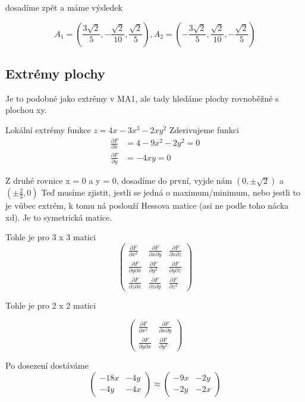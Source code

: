 \documentclass[12pt, letterpaper]{article}
\begin{document}
dosadíme zpět a máme výsledek

\[A_1 = \left(\frac{3\sqrt{2}}{5},  -\frac{\sqrt{2}}{10}, \frac{\sqrt{2}}{5}\right), A_2 = \left(-\frac{3\sqrt{2}}{5},  \frac{\sqrt{2}}{10}, -\frac{\sqrt{2}}{5}\right) \]

\subsection*{Extrémy plochy}
Je to podobné jako extrémy v MA1, ale tady hledáme plochy rovnoběžné s plochou xy.

Lokální extrémy funkce $z = 4x - 3x^3 - 2xy^2$
Zderivujeme funkci
\[\begin{aligned}
\frac{\partial F}{\partial x} &= 4 - 9x^2 - 2y^2 = 0 \\
\frac{\partial F}{\partial y} &= -4xy = 0
\end{aligned}\]

Z druhé rovnice x = 0 a y = 0, dosadíme do první, vyjde nám $(0, \pm \sqrt{2})$ a $(\pm \frac{2}{3}, 0)$
Teď musíme zjistit, jestli se jedná o maximum/minimum, nebo jestli to je vůbec extrém, k tomu ná poslouží Hessova matice (asi ne podle toho nácka xd).
Je to symetrická matice.

Tohle je pro 3 x 3 matici 
\[\begin{pmatrix}
\frac{\partial F}{\partial x^2} & \frac{\partial F}{\partial x \partial y} & \frac{\partial F}{\partial x \partial z}\\
\frac{\partial F}{\partial y \partial x} & \frac{\partial F}{\partial y^2} & \frac{\partial F}{\partial y \partial z}\\
\frac{\partial F}{\partial z \partial x} & \frac{\partial F}{\partial z \partial y} & \frac{\partial F}{\partial z^2}
\end{pmatrix}\]

Tohle je pro 2 x 2 matici 

\[\begin{pmatrix}
\frac{\partial F}{\partial x^2} & \frac{\partial F}{\partial x \partial y}\\
\frac{\partial F}{\partial y \partial x} & \frac{\partial F}{\partial y^2} 
\end{pmatrix}\]


Po dosezení dostáváme
\[\begin{pmatrix}
-18x & -4y\\
-4y & -4x 
\end{pmatrix}
\approx 
\begin{pmatrix}
-9x & -2y\\
-2y & -2x
\end{pmatrix}\]
\end{document}
